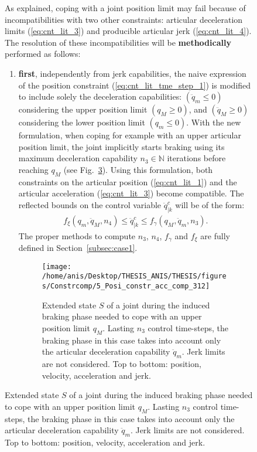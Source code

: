 \begin{figure}[!htbp]
\begin{figure}[!htbp]
\label{fig:per_Pr_jerk_ala_3}
\end{figure}
As explained, coping with a joint position limit may fail because of incompatibilities with two other constraints: articular deceleration limits (\ref{eq:cnt_lit_3}) and producible articular jerk (\ref{eq:cnt_lit_4}). The resolution of these incompatibilities will be \textbf{methodically} performed as follows: 
\begin{enumerate}
\item \textbf{first}, independently from jerk capabilities, the naive expression of the position constraint (\ref{eq:cnt_lit_tme_step_1}) is modified to include solely the deceleration capabilities: $(\ddot{q}_m \leq 0)$ considering the upper position limit $(q_M \geq 0)$, and $(\ddot{q}_M  \geq 0)$ considering the lower position limit $(q_m \leq 0)$. With the new formulation, when coping for example with an upper articular position limit, the joint implicitly starts braking using its maximum deceleration capability $n_{3} \in \mathbb{N}$ iterations before reaching $q_M$ (see Fig.~\ref{fig:5_Posi_constr_acc_comp_312}). Using this formulation, both constraints on the articular position (\ref{eq:cnt_lit_1}) and the articular acceleration (\ref{eq:cnt_lit_3}) become compatible. The reflected bounds on the control variable $\ddot{q}_{|k}^{c}$ will be of the form: 
\begin{equation}
\begin{split}
f_{\xi}(q_m, \ddot{q}_M, n_4) \leq \ddot{q}_{|k}^{c} \leq f_{\gamma}(q_M, \ddot{q}_m, n_3). 
\label{eq:qddot_cond_to_satisfy_Acc_posi_compatibility}
\end{split}
\end{equation}
The proper methods to compute $n_3$, $n_4$, $f_{\gamma}$ and $f_{\xi}$ are fully defined in Section~\ref{subsec:case1}. 
\begin{figure}[!htbp]
{\texttt{[image: /home/anis/Desktop/THESIS\_ANIS/THESIS/figures/Constrcomp/5\_Posi\_constr\_acc\_comp\_312]}}
\caption{Extended state $S$ of a joint during the induced braking phase needed to cope with an upper position limit $q_{M}$. Lasting $n_3$ control time-steps, the braking phase in this case takes into account only the articular deceleration capability $\ddot{q}_m$. Jerk limits are not considered. Top to bottom: position, velocity, acceleration and jerk.} 
\label{fig:5_Posi_constr_acc_comp_312}
\end{figure}

\end{enumerate}
\end{figure}
